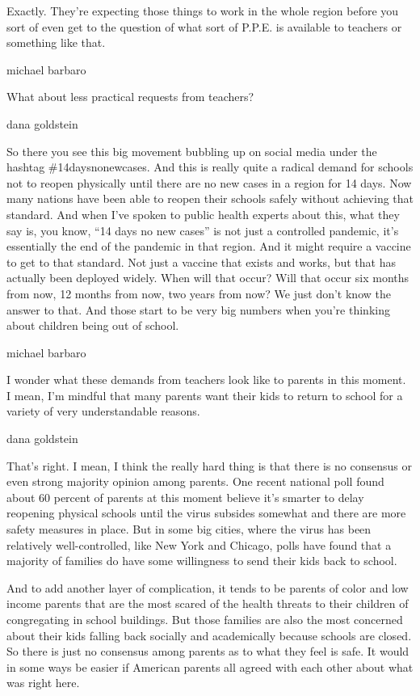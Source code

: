 Exactly. They're expecting those things to work in the whole region
before you sort of even get to the question of what sort of P.P.E. is
available to teachers or something like that.

michael barbaro

What about less practical requests from teachers?

dana goldstein

So there you see this big movement bubbling up on social media under the
hashtag \#14daysnonewcases. And this is really quite a radical demand
for schools not to reopen physically until there are no new cases in a
region for 14 days. Now many nations have been able to reopen their
schools safely without achieving that standard. And when I've spoken to
public health experts about this, what they say is, you know, ``14 days
no new cases'' is not just a controlled pandemic, it's essentially the
end of the pandemic in that region. And it might require a vaccine to
get to that standard. Not just a vaccine that exists and works, but that
has actually been deployed widely. When will that occur? Will that occur
six months from now, 12 months from now, two years from now? We just
don't know the answer to that. And those start to be very big numbers
when you're thinking about children being out of school.

michael barbaro

I wonder what these demands from teachers look like to parents in this
moment. I mean, I'm mindful that many parents want their kids to return
to school for a variety of very understandable reasons.

dana goldstein

That's right. I mean, I think the really hard thing is that there is no
consensus or even strong majority opinion among parents. One recent
national poll found about 60 percent of parents at this moment believe
it's smarter to delay reopening physical schools until the virus
subsides somewhat and there are more safety measures in place. But in
some big cities, where the virus has been relatively well-controlled,
like New York and Chicago, polls have found that a majority of families
do have some willingness to send their kids back to school.

And to add another layer of complication, it tends to be parents of
color and low income parents that are the most scared of the health
threats to their children of congregating in school buildings. But those
families are also the most concerned about their kids falling back
socially and academically because schools are closed. So there is just
no consensus among parents as to what they feel is safe. It would in
some ways be easier if American parents all agreed with each other about
what was right here.

